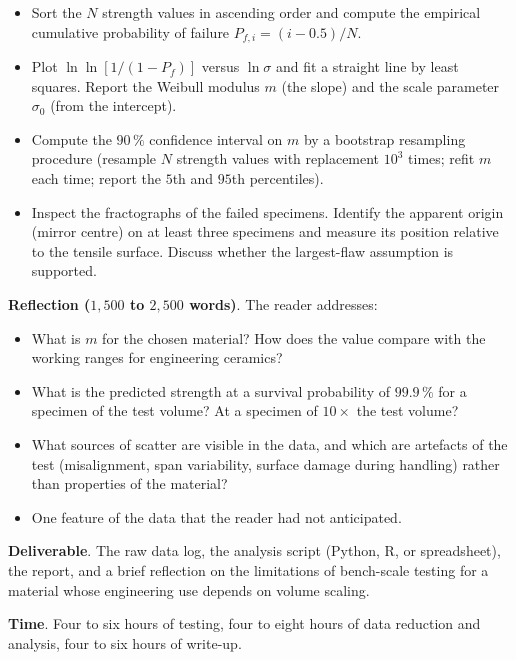 \begin{project}
\begin{itemize}[leftmargin=*]
\item Sort the $N$ strength values in ascending order and compute the
  empirical cumulative probability of failure $P_{f,i} = (i - 0.5)/N$.
\item Plot $\ln \ln[1/(1 - P_f)]$ versus $\ln \sigma$ and fit a
  straight line by least squares. Report the Weibull modulus $m$
  (the slope) and the scale parameter $\sigma_0$ (from the intercept).
\item Compute the $90\,\%$ confidence interval on $m$ by a bootstrap
  resampling procedure (resample $N$ strength values with replacement
  $10^3$ times; refit $m$ each time; report the $5$th and $95$th
  percentiles).
\item Inspect the fractographs of the failed specimens. Identify the
  apparent origin (mirror centre) on at least three specimens and
  measure its position relative to the tensile surface. Discuss
  whether the largest-flaw assumption is supported.
\end{itemize}

\textbf{Reflection ($1{,}500$ to $2{,}500$ words)}. The reader
addresses:

\begin{itemize}[leftmargin=*]
\item What is $m$ for the chosen material? How does the value compare
  with the working ranges for engineering ceramics?
\item What is the predicted strength at a survival probability of
  $99.9\,\%$ for a specimen of the test volume? At a specimen of
  $10\times$ the test volume?
\item What sources of scatter are visible in the data, and which are
  artefacts of the test (misalignment, span variability, surface
  damage during handling) rather than properties of the material?
\item One feature of the data that the reader had not anticipated.
\end{itemize}

\textbf{Deliverable}. The raw data log, the analysis script (Python,
R, or spreadsheet), the report, and a brief reflection on the
limitations of bench-scale testing for a material whose engineering
use depends on volume scaling.

\textbf{Time}. Four to six hours of testing, four to eight hours of
data reduction and analysis, four to six hours of write-up.
\end{project}

